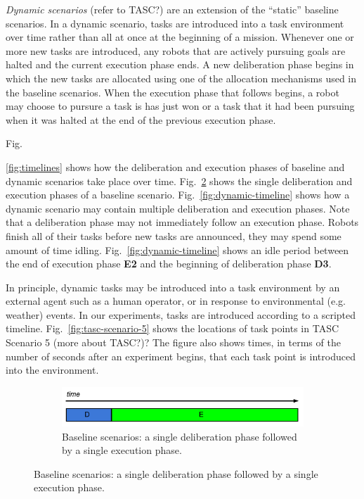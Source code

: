 \documentclass{article}
\begin{document}
\emph{Dynamic scenarios} (refer to TASC?) are an extension of the ``static'' baseline scenarios. In a dynamic scenario, tasks are introduced into a task environment over time rather than all at once at the beginning of a mission. Whenever one or more new tasks are introduced, any robots that are actively pursuing goals are halted and the current execution phase ends. A new deliberation phase begins in which the new tasks are allocated using one of the allocation mechanisms used in the baseline scenarios. When the execution phase that follows begins, a robot may choose to pursure a task is has just won or a task that it had been pursuing when it was halted at the end of the previous execution phase.

Fig.~{\ref{fig:timelines} shows how the deliberation and execution phases of baseline and dynamic scenarios take place over time. Fig.~\ref{fig:baseline-timeline} shows the single deliberation and execution phases of a baseline scenario. Fig.~\ref{fig:dynamic-timeline} shows how a dynamic scenario may contain multiple deliberation and execution phases. Note that a deliberation phase may not immediately follow an execution phase. Robots finish all of their tasks before new tasks are announced, they may spend some amount of time idling. Fig.~\ref{fig:dynamic-timeline} shows an idle period between the end of execution phase \textbf{E2} and the beginning of deliberation phase \textbf{D3}.


In principle, dynamic tasks may be introduced into a task environment by an external agent such as a human operator, or in response to environmental (e.g. weather) events. In our experiments, tasks are introduced according to a scripted timeline. Fig.~\ref{fig:tasc-scenario-5} shows the locations of task points in TASC Scenario 5 (more about TASC?)? The figure also shows times, in terms of the number of seconds after an experiment begins, that each task point is introduced into the environment.

\begin{figure}[h]
	\begin{subfigure}[b]{\textwidth}
	\centering
	\includegraphics[width=12cm,keepaspectratio]{baseline_scenario_timeline-cropped}
	\caption{Baseline scenarios: a single deliberation phase followed by a single  execution phase.}
	\label{fig:baseline-timeline}
	\end{subfigure}


\end{figure}}
\end{document}

